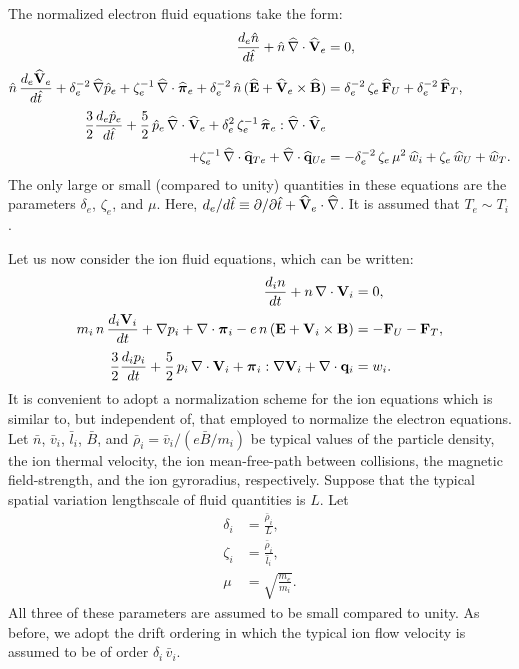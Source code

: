 \documentclass[notitlepage,12pt]{article}
\newcommand{\bpi}{\mbox{\boldmath$\pi$}}
\begin{document}
The normalized electron fluid equations take the form:
\begin{align}
\frac{d_e \hat{n}}{d\hat{t}} + \hat{n}\,\widehat{\nabla}\cdot\widehat{\bf V}_e &=0,\label{e3.113a}\\[0.5ex]
\hat{n}\,\frac{d_e \widehat{\bf V}_e}{d\hat{t}} +
\delta_e^{-2}\,\widehat{\nabla}\hat{p}_e +\zeta_e^{-1}\,\widehat{\nabla}
\cdot\widehat{\bpi}_e  
+ \delta_e^{-2}\,\hat{n}\,(\widehat{\bf E} + \widehat{\bf V}_e
\times\widehat{\bf B}) &= \delta_e^{-2}\,\zeta_e\,\widehat{\bf F}_U +\delta_e^{-2}\,\widehat{\bf F}_T, \\[0.5ex]
\frac{3}{2}\frac{d_e \hat{p}_e}{d\hat{t}} + \frac{5}{2}\,
\hat{p}_e\,\widehat{\nabla}\cdot\widehat{\bf V}_e + \delta_e^{2}\,
\zeta_e^{-1}\,\widehat{\bpi}_e : \widehat{\nabla}\cdot\widehat{\bf V}_e&\nonumber\label{e3.113c}\\[0.5ex] 
+\zeta_e^{-1} \,\widehat{\nabla}\cdot\widehat{\bf q}_{Te}
 +\widehat{\nabla}\cdot\widehat{\bf q}_{Ue} 
&= -\delta_e^{-2}\,\zeta_e\,\mu^2\,\widehat{w}_i + \zeta_e\,
\widehat{w}_U +\widehat{w}_T.
\end{align}
The only large or small (compared to unity) quantities in these equations are the
parameters $\delta_e$, $\zeta_e$, and $\mu$. 
Here, $d_e/d\hat{t}\equiv\partial /\partial\hat{t} +
 \widehat{\bf V}_e\cdot\widehat{\nabla}$. It is assumed that $T_e\sim T_i$.

Let us now consider the ion fluid equations, which can be written:
\begin{align}
\frac{d_i n}{dt} + n\,\nabla\cdot{\bf V}_i &= 0,\\[0.5ex]
m_i\, n\,\frac{d_i {\bf V}_i}{dt} + \nabla p_i + \nabla\cdot \bpi_i - e\, n\,
({\bf E} + {\bf V}_i\times {\bf B})& =- {\bf F}_U -{\bf F}_T,\\[0.5ex]
\frac{3}{2}\frac{d_i p_i}{dt} + \frac{5}{2}\,p_i\,\nabla \cdot {\bf V}_i
+ \bpi_i:\nabla{\bf V}_i+ \nabla\cdot{\bf q}_i & =w_i.
\end{align}
It is convenient to adopt a normalization scheme for the ion equations
which is similar to, but independent of, that employed to normalize the
electron equations. Let  $\bar{n}$, $\bar{v}_i$, $\bar{l}_i$, $\bar{B}$,
and $\bar{\rho}_i =\bar{ v}_i/(e\bar{B}/m_i)$  be typical values
of the particle density, the ion  thermal velocity, the ion
mean-free-path between collisions,  the magnetic field-strength, and the
ion gyroradius,  respectively. 
Suppose that 
the typical spatial variation lengthscale of fluid quantities is $L$. Let
 \begin{align}
\delta_i &= \frac{\bar{\rho}_i}{L},\\[0.5ex]
\zeta_i &= \frac{\bar{\rho}_i}{\bar{l}_i},\\[0.5ex]
\mu &= \sqrt{\frac{m_e}{m_i}}.
\end{align}
All three of these parameters are assumed to be  small 
compared to unity.  As before, we adopt the drift ordering in which the typical ion flow velocity is assumed to be of order $\delta_i\,\bar{v}_i$. 
\end{document}
